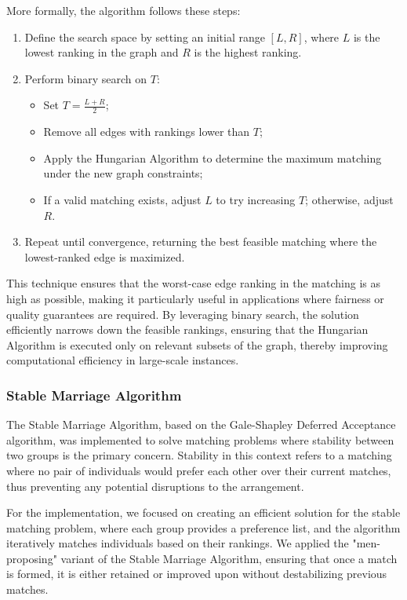         More formally, the algorithm follows these steps:
        
        \begin{enumerate}
            \item Define the search space by setting an initial range \([L, R]\), where \( L \) is the lowest ranking in the graph and \( R \) is the highest ranking.
            \item Perform binary search on \( T \):
            \begin{itemize}
                \item Set \( T = \frac{L + R}{2} \);
                \item Remove all edges with rankings lower than \( T \);
                \item Apply the Hungarian Algorithm to determine the maximum matching under the new graph constraints;
                \item If a valid matching exists, adjust \( L \) to try increasing \( T \); otherwise, adjust \( R \).
            \end{itemize}
            \item Repeat until convergence, returning the best feasible matching where the lowest-ranked edge is maximized.
        \end{enumerate}
        
        This technique ensures that the worst-case edge ranking in the matching is as high as possible, making it particularly useful in applications where fairness or quality guarantees are required. By leveraging binary search, the solution efficiently narrows down the feasible rankings, ensuring that the Hungarian Algorithm is executed only on relevant subsets of the graph, thereby improving computational efficiency in large-scale instances.
        
    
    \subsubsection{Stable Marriage Algorithm}
    The Stable Marriage Algorithm, based on the Gale-Shapley Deferred Acceptance algorithm, was implemented to solve matching problems where stability between two groups is the primary concern. Stability in this context refers to a matching where no pair of individuals would prefer each other over their current matches, thus preventing any potential disruptions to the arrangement.
    
    For the implementation, we focused on creating an efficient solution for the stable matching problem, where each group provides a preference list, and the algorithm iteratively matches individuals based on their rankings. We applied the "men-proposing" variant of the Stable Marriage Algorithm, ensuring that once a match is formed, it is either retained or improved upon without destabilizing previous matches.
    
